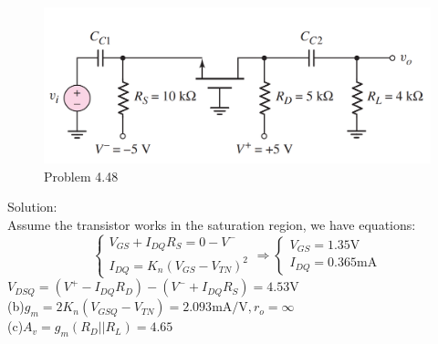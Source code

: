 \documentclass[a4paper,11pt,UTF8]{article}
\begin{document}
\begin{figure}[H] 
	\centering 
	\includegraphics[scale=0.3]{MD4.48.png}
	\caption{Problem 4.48}
\end{figure}
\noindent Solution:\\
Assume the transistor works in the saturation region, we have equations:
$$\begin{cases}
	V_{GS}+I_{DQ}R_S=0-V^-\\
	I_{DQ}=K_n(V_{GS}-V_{TN})^2
\end{cases}\Rightarrow
\begin{cases}
	V_{GS}=1.35\mathrm{V}\\
	I_{DQ}=0.365\mathrm{mA}
\end{cases}
$$
$V_{DSQ}=(V^+-I_{DQ}R_D)-(V^-+I_{DQ}R_S)=4.53\mathrm{V}$\\
(b)$g_m=2K_n(V_{GSQ}-V_{TN})=2.093\mathrm{mA/V},r_o=\infty$\\
(c)$A_v=g_m(R_D||R_L)=4.65$
\end{document}

